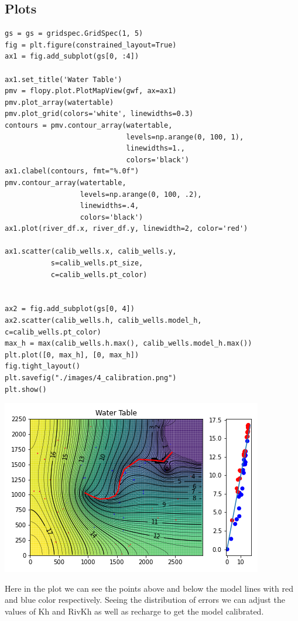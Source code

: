\documentclass[titlepage,12pt]{unisubmission}
\begin{document}
\subsection{Plots}
\label{sec:org0d9c338}

\begin{verbatim}
gs = gs = gridspec.GridSpec(1, 5)
fig = plt.figure(constrained_layout=True)
ax1 = fig.add_subplot(gs[0, :4])

ax1.set_title('Water Table')
pmv = flopy.plot.PlotMapView(gwf, ax=ax1)
pmv.plot_array(watertable)
pmv.plot_grid(colors='white', linewidths=0.3)
contours = pmv.contour_array(watertable,
                             levels=np.arange(0, 100, 1),
                             linewidths=1.,
                             colors='black')
ax1.clabel(contours, fmt="%.0f")
pmv.contour_array(watertable,
                  levels=np.arange(0, 100, .2),
                  linewidths=.4,
                  colors='black')
ax1.plot(river_df.x, river_df.y, linewidth=2, color='red')

ax1.scatter(calib_wells.x, calib_wells.y,
           s=calib_wells.pt_size,
           c=calib_wells.pt_color)


ax2 = fig.add_subplot(gs[0, 4])
ax2.scatter(calib_wells.h, calib_wells.model_h, c=calib_wells.pt_color)
max_h = max(calib_wells.h.max(), calib_wells.model_h.max())
plt.plot([0, max_h], [0, max_h])
fig.tight_layout()
plt.savefig("./images/4_calibration.png")
plt.show()
\end{verbatim}

\begin{center}
\includegraphics[width=.9\linewidth]{./images/4_calibration.png}
\end{center}

Here in the plot we can see the points above and below the model lines with red and blue color respectively. Seeing the distribution of errors we can adjust the values of Kh and RivKh as well as recharge to get the model calibrated.
\end{document}
